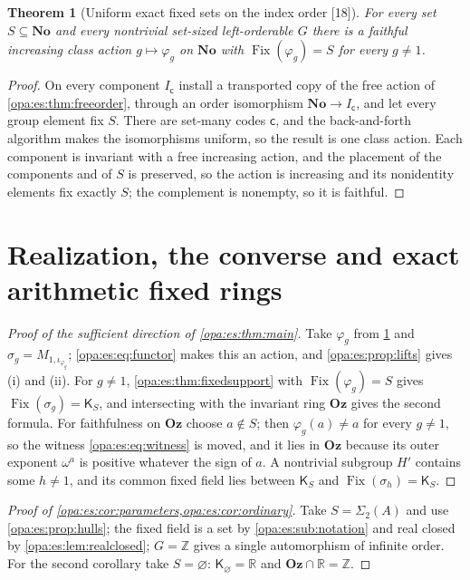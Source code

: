 \documentclass[11pt,oneside]{article}
\numberwithin{equation}{section}
\newtheorem{theorem}{Theorem}[section]
\theoremstyle{definition}
\theoremstyle{remark}
\newcommand{\No}{\mathbf{No}}
\newcommand{\Oz}{\mathbf{Oz}}
\newcommand{\R}{\mathbb R}
\newcommand{\Z}{\mathbb Z}
\newcommand{\Fix}{\operatorname{Fix}}
\newcommand{\src}[1]{\textup{\textsf{\small[#1]}}}
\begin{document}
\begin{theorem}[Uniform exact fixed sets on the index order \src{18}]\label{opa:es:thm:exactindex}
For every set $S\subseteq\No$ and every nontrivial set-sized left-orderable $G$ there is a faithful increasing class action
$g\mapsto\varphi_g$ on $\No$ with $\Fix(\varphi_g)=S$ for every $g\ne1$.
\end{theorem}
\begin{proof}
On every component $I_{\mathsf c}$ install a transported copy of the free action of \cref{opa:es:thm:freeorder}, through an order
isomorphism $\No\to I_{\mathsf c}$, and let every group element fix $S$. There are set-many codes $\mathsf c$, and the back-and-forth
algorithm makes the isomorphisms uniform, so the result is one class action. Each component is invariant with a free increasing
action, and the placement of the components and of $S$ is preserved, so the action is increasing and its nonidentity elements fix
exactly $S$; the complement is nonempty, so it is faithful.
\end{proof}

\section{Realization, the converse and exact arithmetic fixed rings}\label{opa:es:sec:realization}

\begin{proof}[Proof of the sufficient direction of \cref{opa:es:thm:main}]
Take $\varphi_g$ from \cref{opa:es:thm:exactindex} and $\sigma_g=M_{1,\iota_{\varphi_g}}$; \eqref{opa:es:eq:functor} makes this an action,
and \cref{opa:es:prop:lifts} gives (i) and (ii). For $g\ne1$, \cref{opa:es:thm:fixedsupport} with $\Fix(\varphi_g)=S$ gives
$\Fix(\sigma_g)=\mathsf K_S$, and intersecting with the invariant ring $\Oz$ gives the second formula. For faithfulness on $\Oz$ choose
$a\notin S$; then $\varphi_g(a)\ne a$ for every $g\ne1$, so the witness \eqref{opa:es:eq:witness} is moved, and it lies in $\Oz$ because its
outer exponent $\omega^a$ is positive whatever the sign of $a$. A nontrivial subgroup $H'$ contains some $h\ne1$, and its common fixed
field lies between $\mathsf K_S$ and $\Fix(\sigma_h)=\mathsf K_S$.
\end{proof}

\begin{proof}[Proof of \cref{opa:es:cor:parameters,opa:es:cor:ordinary}]
Take $S=\Sigma_2(A)$ and use \cref{opa:es:prop:hulls}; the fixed field is a set by \cref{opa:es:sub:notation} and real closed by
\cref{opa:es:lem:realclosed}; $G=\Z$ gives a single automorphism of infinite order. For the second corollary take $S=\varnothing$:
$\mathsf K_\varnothing=\R$ and $\Oz\cap\R=\Z$.
\end{proof}
\end{document}
